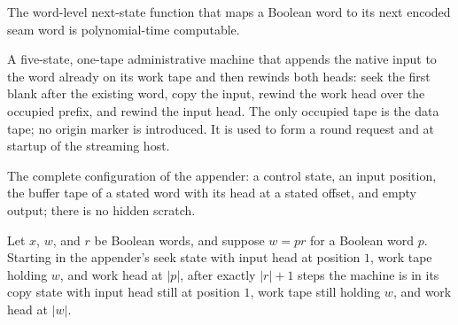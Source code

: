\begin{lemma}
\label{Complexity.satReqStep_poly}
\leanok
{}
The word-level next-state function that maps a Boolean word to its next encoded seam
word is polynomial-time computable.
\end{lemma}
\begin{definition}
\label{Complexity.satAppendTM}
\leanok
{}
A five-state, one-tape administrative machine that appends the native input to
the word already on its work tape and then rewinds both heads: seek the first
blank after the existing word, copy the input, rewind the work head over the
occupied prefix, and rewind the input head. The only occupied tape is the data
tape; no origin marker is introduced. It is used to form a round request and at
startup of the streaming host.
\end{definition}

\begin{definition}
\label{Complexity.satAppendCfg}
\leanok
{}
The complete configuration of the appender: a control state, an input position,
the buffer tape of a stated word with its head at a stated offset, and empty
output; there is no hidden scratch.
\end{definition}

\begin{lemma}
\label{Complexity.satAppend_seek}
\leanok
{}
Let $x$, $w$, and $r$ be Boolean words, and suppose $w=p r$ for a Boolean word $p$.
Starting in the appender's seek state with input head at position $1$, work tape holding
$w$, and work head at $|p|$, after exactly $|r|+1$ steps the machine is in its copy
state with input head still at position $1$, work tape still holding $w$, and work head
at $|w|$.
\end{lemma}

